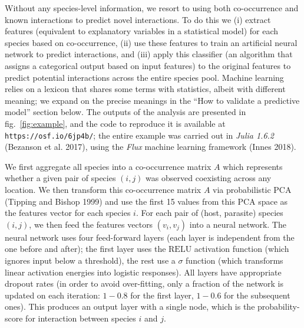 \documentclass[11pt]{article}
\begin{document}
Without any species-level information, we resort to using both
co-occurrence and known interactions to predict novel interactions. To
do this we (i) extract features (equivalent to explanatory variables in
a statistical model) for each species based on co-occurrence, (ii) use
these features to train an artificial neural network to predict
interactions, and (iii) apply this classifier (an algorithm that assigns
a categorical output based on input features) to the original features
to predict potential interactions across the entire species pool.
Machine learning relies on a lexicon that shares some terms with
statistics, albeit with different meaning; we expand on the precise
meanings in the ``How to validate a predictive model'' section below.
The outputs of the analysis are presented in fig.~\ref{fig:example}, and
the code to reproduce it is available at \texttt{https://osf.io/6jp4b/};
the entire example was carried out in \emph{Julia 1.6.2} (Bezanson et
al. 2017), using the \emph{Flux} machine learning framework (Innes
2018).

We first aggregate all species into a co-occurrence matrix \(A\) which
represents whether a given pair of species \((i,j)\) was observed
coexisting across any location. We then transform this co-occurrence
matrix \(A\) via probabilistic PCA (Tipping and Bishop 1999) and use the
first 15 values from this PCA space as the features vector for each
species \(i\). For each pair of (host, parasite) species \((i,j)\), we
then feed the features vectors \((v_i, v_j)\) into a neural network. The
neural network uses four feed-forward layers (each layer is independent
from the one before and after); the first layer uses the \(\text{RELU}\)
activation function (which ignores input below a threshold), the rest
use a \(\sigma\) function (which transforms linear activation energies
into logistic responses). All layers have appropriate dropout rates (in
order to avoid over-fitting, only a fraction of the network is updated
on each iteration: \(1-0.8\) for the first layer, \(1-0.6\) for the
subsequent ones). This produces an output layer with a single node,
which is the probability-score for interaction between species \(i\) and
\(j\).
\end{document}

